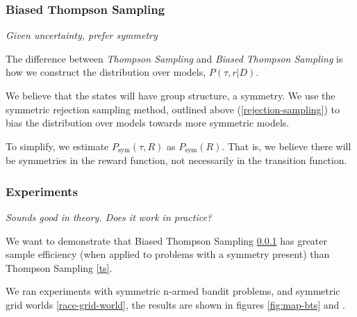 \subsubsection{Biased Thompson Sampling}\label{bts}

\begin{displayquote}
\textsl{Given uncertainty, prefer symmetry}
\end{displayquote}

The difference between \textit{Thompson Sampling} and \textit{Biased Thompson Sampling}
is how we construct the distribution over models, $P(\tau, r |D)$.

We believe that the states will have group structure, a symmetry.
We use the symmetric rejection sampling method, outlined above (\ref{rejection-sampling}) to bias the
distribution over models towards more symmetric models.

To simplify, we estimate $P_{\text{sym}}(\tau, R)$ as $P_{\text{sym}}(R)$. That is, we believe there will be symmetries in the reward function, not necessarily in the transition function.

%
%

\subsubsection{Experiments}

\begin{displayquote}
	\textsl{Sounds good in theory. Does it work in practice?}
\end{displayquote}

We want to demonstrate that Biased Thompson Sampling \ref{bts} has greater sample efficiency (when applied to problems with a symmetry present) than Thompson Sampling \ref{ts}.

We ran experiments with symmetric n-armed bandit problems, and symmetric grid worlds \ref{race-grid-world}\footnotemark, the results are shown in figures \ref{fig:map-bts} and \label{fig:explicit-sym}.

